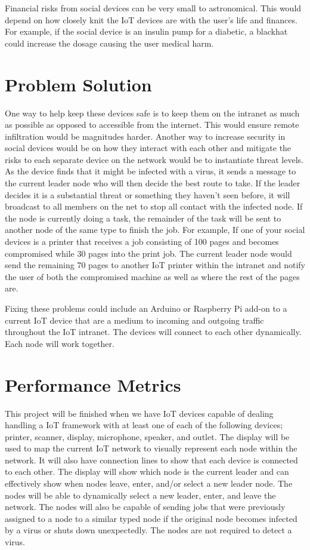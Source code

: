 \documentclass[draftclsnofoot, onecolumn, 10pt]{IEEEtran}
\begin{document}
Financial risks from social devices can be very small to astronomical.  This would depend on how closely knit the IoT devices are with the user’s life and finances.  For example, if the social device is an insulin pump for a diabetic, a blackhat could increase the dosage causing the user medical harm.

\vspace{0.0 in}

\section*{Problem Solution}
One way to help keep these devices safe is to keep them on the intranet as much as possible as opposed to accessible from the internet.  This would ensure remote infiltration would be magnitudes harder. Another way to increase security in social devices would be on how they interact with each other and mitigate the risks to each separate device on the network would be to instantiate threat levels. As the device finds that it might be infected with a virus, it sends a message to the current leader node who will then decide the best route to take.  If the leader decides it is a substantial threat or something they haven’t seen before, it will broadcast to all members on the net to stop all contact with the infected node. If the node is currently doing a task, the remainder of the task will be sent to another node of the same type to finish the job.  For example, If one of your social devices is a printer that receives a job consisting of 100 pages and becomes compromised while 30 pages into the print job. The current leader node would send the remaining 70 pages to another IoT printer within the intranet and notify the user of both the compromised machine as well as where the rest of the pages are.

Fixing these problems could include an Arduino or Raspberry Pi add-on to a current IoT device that are a medium to incoming and outgoing traffic throughout the IoT intranet.  The devices will connect to each other dynamically.  Each node will work together.



\section*{Performance Metrics}
This project will be finished when we have IoT devices capable of dealing handling a IoT framework with at least one of each of the following devices; printer, scanner, display, microphone, speaker, and outlet.  The display will be used to map the current IoT network to visually represent each node within the network. It will also have connection lines to show that each device is connected to each other.  The display will show which node is the current leader and can effectively show when nodes leave, enter, and/or select a new leader node. The nodes will be able to dynamically select a new leader, enter, and leave the network.  The nodes will also be capable of sending jobs that were previously assigned to a node to a similar typed node if the original node becomes infected by a virus or shuts down unexpectedly. The nodes are not required to detect a virus.
\end{document}
